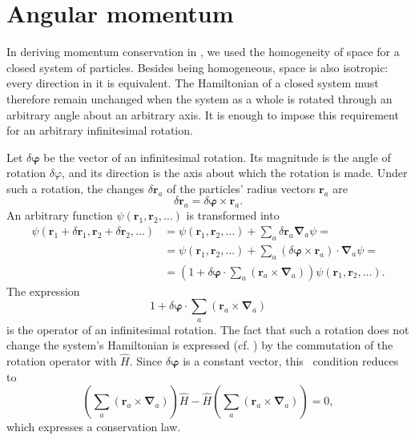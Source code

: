 \section{Angular momentum}

In deriving momentum conservation in , we used the homogeneity of space
for a closed system of particles. Besides being homogeneous, space is also
isotropic: every direction in it is equivalent. The Hamiltonian of a closed
system must therefore remain unchanged when the system as a whole is rotated
through an arbitrary angle about an arbitrary axis. It is enough to impose
this requirement for an arbitrary infinitesimal rotation.

Let $\delta\boldsymbol\varphi$ be the vector of an infinitesimal rotation. Its
magnitude is the angle of rotation $\delta\varphi$, and its direction is the
axis about which the rotation is made. Under such a rotation, the changes
$\delta\mathbf r_a$ of the particles' radius vectors $\mathbf r_a$ are
\[
  \delta\mathbf r_a=\delta\boldsymbol\varphi\times\mathbf r_a.
\]
An arbitrary function $\psi(\mathbf r_1,\mathbf r_2,\ldots)$ is transformed
into
\[
  \begin{aligned}
  \psi(\mathbf r_1+\delta\mathbf r_1,
       \mathbf r_2+\delta\mathbf r_2,\ldots)
    &=\psi(\mathbf r_1,\mathbf r_2,\ldots)
      +\sum_a\delta\mathbf r_a\boldsymbol\nabla_a\psi={}\\
    &=\psi(\mathbf r_1,\mathbf r_2,\ldots)
      +\sum_a(\delta\boldsymbol\varphi\times\mathbf r_a)
      \!\cdot\boldsymbol\nabla_a\psi={}\\
    &=\left(1+\delta\boldsymbol\varphi\!\cdot
      \sum_a(\mathbf r_a\times\boldsymbol\nabla_a)\right)
      \psi(\mathbf r_1,\mathbf r_2,\ldots).
  \end{aligned}
\]
The expression
\[
  1+\delta\boldsymbol\varphi\!\cdot
  \sum_a(\mathbf r_a\times\boldsymbol\nabla_a)
\]
is the operator of an infinitesimal rotation. The fact that such a rotation
does not change the system's Hamiltonian is expressed (cf. ) by the
commutation of the rotation operator with $\hat H$. Since
$\delta\boldsymbol\varphi$ is a constant vector, this%
\relax\ condition reduces to
\begin{equation}
  \left(\sum_a(\mathbf r_a\times\boldsymbol\nabla_a)\right)\hat H
  -\hat H\left(\sum_a(\mathbf r_a\times\boldsymbol\nabla_a)\right)=0,
  \tag{26.1}
\end{equation}
which expresses a conservation law.

